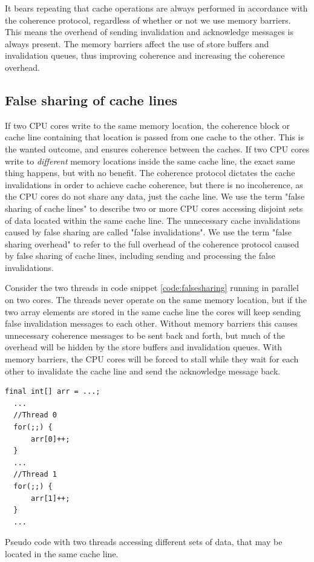 It bears repeating that cache operations are always performed in accordance with
the coherence protocol, regardless of whether or not we use memory barriers.
This means the overhead of sending invalidation and acknowledge messages is
always present. The memory barriers affect the use of store buffers and
invalidation queues, thus improving coherence and increasing the coherence
overhead.

\subsection{False sharing of cache lines}
If two CPU cores write to the same memory location, the coherence block or cache
line containing that location is passed from one cache to the other. This is the
wanted outcome, and ensures coherence between the caches. If two CPU cores write
to \textit{different} memory locations inside the same cache line, the exact
same thing happens, but with no benefit. The coherence protocol dictates the
cache invalidations in order to achieve cache coherence, but there is no
incoherence, as the CPU cores do not share any data, just the cache line. We use
the term "false sharing of cache lines" to describe two or more CPU cores
accessing disjoint sets of data located within the same cache line. The
unnecessary cache invalidations caused by false sharing are called "false
invalidations". We use the term "false sharing overhead" to refer to the full
overhead of the coherence protocol caused by false sharing of cache lines,
including sending and processing the false invalidations.

Consider the two threads in code snippet \ref{code:falsesharing} running in
parallel on two cores. The threads never operate on the same memory location, but
if the two array elements are stored in the same cache line the cores will keep
sending false invalidation messages to each other. Without memory barriers this
causes unnecessary coherence messages to be sent back and forth, but much of the
overhead will be hidden by the store buffers and invalidation queues. With
memory barriers, the CPU cores will be forced to stall while they wait for each
other to invalidate the cache line and send the acknowledge message back.

\begin{code}
\begin{Verbatim}[frame=single]
  final int[] arr = ...;
  ...
  //Thread 0
  for(;;) {
	  arr[0]++;
  }
  ...
  //Thread 1
  for(;;) {
	  arr[1]++;
  }
  ...
\end{Verbatim}
	\caption{Pseudo code with two threads accessing different sets of data,
	that may be located in the same cache line.}
	\label{code:falsesharing}
\end{code}

